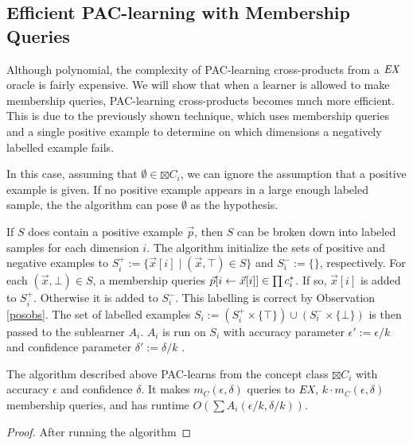 \subsection{Efficient PAC-learning with Membership Queries}

Although polynomial, the complexity of PAC-learning cross-products from a $\emph{EX}$ oracle is fairly expensive. 
We will show that when a learner is allowed to make membership queries, PAC-learning cross-products becomes much more efficient. 
This is due to the previously shown technique, which uses membership queries and a single positive example to determine on which dimensions a negatively labelled example fails. 

In this case, assuming that $\emptyset \in \boxtimes C_i$, we can ignore the assumption that a positive example is given. 
If no positive example appears in a large enough labeled sample, the the algorithm can pose $\emptyset$ as the hypothesis.






If $S$ does contain a positive example $\vec{p}$, then $S$ can be broken down into labeled samples for each dimension $i$. 
The algorithm initialize the sets of positive and negative examples to $S^+_i := \{ \vec{x}[i] \mid  (\vec{x}, \top) \in S\}$ and $S^-_i := \{ \}$, respectively.
For each $(\vec{x}, \bot) \in S$, a membership queries $\vec{p}[i \leftarrow \vec{x}[i]] \in \prod c^*_i$. 
If so, $\vec{x}[i] $ is added to $S^+_i$.
Otherwise it is added to $S^-_i$.
This labelling is correct by Observation \ref{posobs}.
The set of labelled examples $S_i := (S_i^+ \times \{\top\}) \cup (S_i^- \times \{\bot\})$ is then passed to the sublearner $A_i$.
$A_i$ is run on $S_i$ with accuracy parameter $\epsilon' := \epsilon / k$ and confidence parameter $\delta' := \delta / k$ .


\begin{proposition}
The algorithm described above PAC-learns from the concept class $\boxtimes C_i$ with accuracy $\epsilon$ and confidence $\delta$.
It makes $m_C(\epsilon, \delta)$ queries to $\emph{EX}$, $k \cdot m_C(\epsilon, \delta)$ membership queries, and has runtime $O(\sum A_i(\epsilon / k, \delta / k))$.
\end{proposition}
\begin{proof}
After running the algorithm 
\end{proof}
